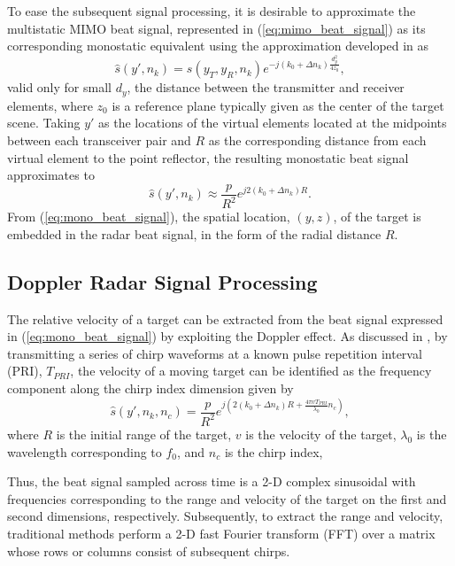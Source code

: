 \documentclass[10pt,journal,final]{IEEEtran}
\begin{document}
To ease the subsequent signal processing, it is desirable to approximate the multistatic MIMO beat signal, represented in (\ref{eq:mimo_beat_signal}) as its corresponding monostatic equivalent using the approximation developed in \cite{yanik2020development} as
\begin{equation}
	\label{eq:mult-to-mono}
	\hat{s}(y',n_k) = s(y_T,y_R,n_k) e^{-j(k_0 + \Delta n_k)\frac{d_y^2}{4z_0}},
\end{equation}
valid only for small $d_y$, the distance between the transmitter and receiver elements, where $z_0$ is a reference plane typically given as the center of the target scene. 
Taking $y'$ as the locations of the virtual elements located at the midpoints between each transceiver pair and $R$ as the corresponding distance from each virtual element to the point reflector, the resulting monostatic beat signal approximates to
\begin{equation}
	\label{eq:mono_beat_signal}
	\hat{s}(y',n_k) \approx \frac{p}{R^2}e^{j2(k_0 + \Delta n_k)R}.
\end{equation}
From (\ref{eq:mono_beat_signal}), the spatial location, $(y,z)$, of the target is embedded in the radar beat signal, in the form of the radial distance $R$.

\subsection{Doppler Radar Signal Processing}
\label{subsec:fmcw_doppler_radar}
The relative velocity of a target can be extracted from the beat signal expressed in (\ref{eq:mono_beat_signal}) by exploiting the Doppler effect.
As discussed in \cite{winkler2007range}, by transmitting a series of chirp waveforms at a known pulse repetition interval (PRI), $T_{PRI}$, the velocity of a moving target can be identified as the frequency component along the chirp index dimension given by
\begin{equation}
	\label{eq:doppler_final}
	\hat{s}(y',n_k,n_c) = \frac{p}{R^2} e^{j(2(k_0 + \Delta n_k)R + \frac{4\pi v T_{PRI}}{\lambda_0}n_c)},
\end{equation}
where $R$ is the initial range of the target, $v$ is the velocity of the target, $\lambda_0$ is the wavelength corresponding to $f_0$, and $n_c$ is the chirp index,

Thus, the beat signal sampled across time is a 2-D complex sinusoidal with frequencies corresponding to the range and velocity of the target on the first and second dimensions, respectively. Subsequently, to extract the range and velocity, traditional methods perform a 2-D fast Fourier transform (FFT) over a matrix whose rows or columns consist of subsequent chirps. 
\end{document}

